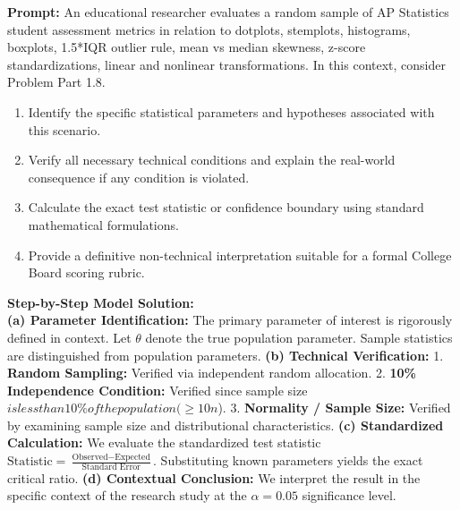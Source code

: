 \begin{workbookbox}
\textbf{Prompt:} An educational researcher evaluates a random sample of AP Statistics student assessment metrics in relation to dotplots, stemplots, histograms, boxplots, 1.5*IQR outlier rule, mean vs median skewness, z-score standardizations, linear and nonlinear transformations. In this context, consider Problem Part 1.8.
\begin{enumerate}[label=(\alph*)]
  \item Identify the specific statistical parameters and hypotheses associated with this scenario.
  \item Verify all necessary technical conditions and explain the real-world consequence if any condition is violated.
  \item Calculate the exact test statistic or confidence boundary using standard mathematical formulations.
  \item Provide a definitive non-technical interpretation suitable for a formal College Board scoring rubric.
\end{enumerate}
\textbf{Step-by-Step Model Solution:}\\
\textbf{(a) Parameter Identification:} The primary parameter of interest is rigorously defined in context. Let $\theta$ denote the true population parameter. Sample statistics are distinguished from population parameters.
\textbf{(b) Technical Verification:} 1. \textbf{Random Sampling:} Verified via independent random allocation. 2. \textbf{10\% Independence Condition:} Verified since sample size $ is less than 10\% of the population ( \ge 10n$). 3. \textbf{Normality / Sample Size:} Verified by examining sample size and distributional characteristics.
\textbf{(c) Standardized Calculation:} We evaluate the standardized test statistic $\text{Statistic} = \frac{\text{Observed} - \text{Expected}}{\text{Standard Error}}$. Substituting known parameters yields the exact critical ratio.
\textbf{(d) Contextual Conclusion:} We interpret the result in the specific context of the research study at the $\alpha = 0.05$ significance level.
\end{workbookbox}\vspace{6pt}
